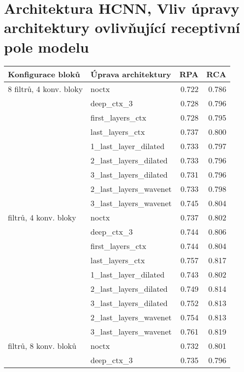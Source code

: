 \documentclass[12pt,a4paper]{report}
\begin{document}

\section{Architektura HCNN, Vliv úpravy architektury ovlivňující receptivní pole modelu}\label{appendix:hcnn_ctx}

\begin{table}[h]
\centering
\begin{tabular}{llrr}

\toprule
Konfigurace bloků & Úprava architektury &   RPA &   RCA \\
\midrule
8 filtrů, 4 konv. bloky & noctx & 0.722 & 0.786 \\
{} & deep\_ctx\_3 & 0.728 & 0.796 \\
{} & first\_layers\_ctx & 0.728 & 0.795 \\
{} & last\_layers\_ctx & 0.737 & 0.800 \\
{} & 1\_last\_layer\_dilated & 0.733 & 0.797 \\
{} & 2\_last\_layers\_dilated & 0.733 & 0.796 \\
{} & 3\_last\_layers\_dilated & 0.731 & 0.796 \\
{} & 2\_last\_layers\_wavenet & 0.733 & 0.798 \\
{} & 3\_last\_layers\_wavenet & 0.745 & 0.804 \\
\arrayrulecolor{black!30}\midrule
16 filtrů, 4 konv. bloky & noctx & 0.737 & 0.802 \\
{} & deep\_ctx\_3 & 0.744 & 0.806 \\
{} & first\_layers\_ctx & 0.744 & 0.804 \\
{} & last\_layers\_ctx & 0.757 & 0.817 \\
{} & 1\_last\_layer\_dilated & 0.743 & 0.802 \\
{} & 2\_last\_layers\_dilated & 0.749 & 0.814 \\
{} & 3\_last\_layers\_dilated & 0.752 & 0.813 \\
{} & 2\_last\_layers\_wavenet & 0.754 & 0.813 \\
{} & 3\_last\_layers\_wavenet & 0.761 & 0.819 \\
\arrayrulecolor{black!30}\midrule
8 filtrů, 8 konv. bloků & noctx & 0.732 & 0.801 \\
{} & deep\_ctx\_3 & 0.735 & 0.796 \\

\end{tabular}
\end{table}
\end{document}
